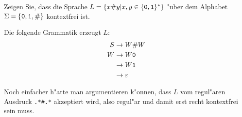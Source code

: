 Zeigen Sie, dass die Sprache $L=\{x{\tt\#}y|x,y\in\{{\tt 0},{\tt 1}\}^*\}$
"uber dem Alphabet $\Sigma = \{{\tt 0},{\tt 1},{\tt \#}\}$
kontextfrei ist.

\begin{loesung}
Die folgende Grammatik erzeugt $L$:
\begin{align*}
S&\to W {\tt \#} W\\
W&\to W{\tt 0}\\
 &\to W{\tt 1}\\
 &\to\varepsilon
\end{align*}

Noch einfacher h"atte man argumentieren k"onnen, dass $L$
vom regul"aren Ausdruck {\tt .*\#.*} akzeptiert wird, also
regul"ar und damit erst recht kontextfrei sein muss.
\end{loesung}
